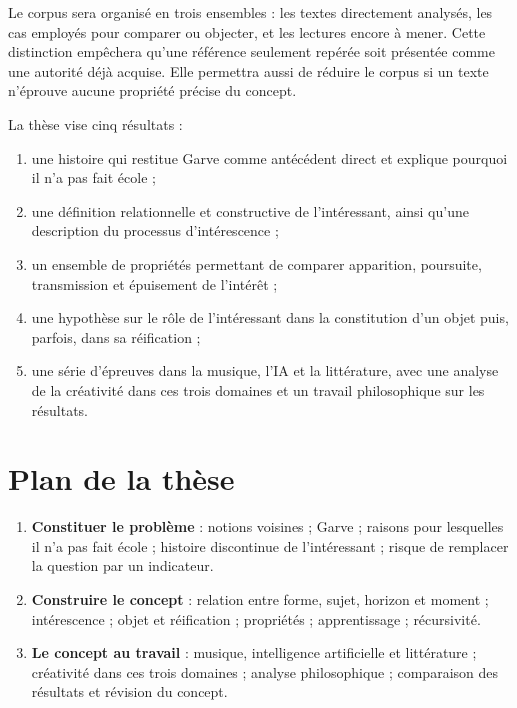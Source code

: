 \documentclass[11pt,a4paper]{article}
\begin{document}
Le corpus sera organisé en trois ensembles : les textes directement analysés,
les cas employés pour comparer ou objecter, et les lectures encore à mener.
Cette distinction empêchera qu'une référence seulement repérée soit présentée
comme une autorité déjà acquise. Elle permettra aussi de réduire le corpus si
un texte n'éprouve aucune propriété précise du concept.

La thèse vise cinq résultats :

\begin{enumerate}
  \item une histoire qui restitue Garve comme antécédent direct et explique
        pourquoi il n'a pas fait école ;
  \item une définition relationnelle et constructive de l'intéressant, ainsi
        qu'une description du processus d'intérescence ;
  \item un ensemble de propriétés permettant de comparer apparition,
        poursuite, transmission et épuisement de l'intérêt ;
  \item une hypothèse sur le rôle de l'intéressant dans la constitution d'un
        objet puis, parfois, dans sa réification ;
  \item une série d'épreuves dans la musique, l'IA et la littérature, avec une
        analyse de la créativité dans ces trois domaines et un travail
        philosophique sur les résultats.
\end{enumerate}

\section{Plan de la thèse}

\begin{enumerate}
  \item \textbf{Constituer le problème} : notions voisines ; Garve ; raisons
        pour lesquelles il n'a pas fait école ; histoire discontinue de
        l'intéressant ; risque de remplacer la question par un indicateur.
  \item \textbf{Construire le concept} : relation entre forme, sujet, horizon
        et moment ; intérescence ; objet et réification ; propriétés ;
        apprentissage ; récursivité.
  \item \textbf{Le concept au travail} : musique, intelligence artificielle et
        littérature ; créativité dans ces trois domaines ; analyse
        philosophique ; comparaison des résultats et révision du concept.
\end{enumerate}
\end{document}
